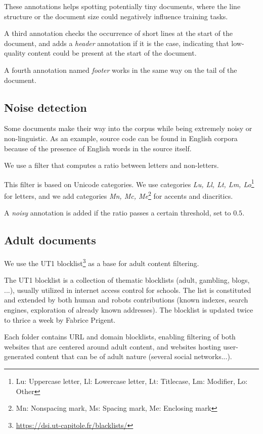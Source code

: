 These annotations helps spotting potentially tiny documents, where the line structure or the document size could negatively influence training tasks.

A third annotation checks the occurrence of short lines at the start of the document, and adds a \emph{header} annotation if it is the case, indicating that low-quality content could be present at the start of the document.

A fourth annotation named \emph{footer} works in the same way on the tail of the document.

\subsection{Noise detection}

Some documents make their way into the corpus while being extremely noisy or non-linguistic. As an example, source code can be found in English corpora because of the presence of English words in the source itself.

We use a filter that computes a ratio between letters and non-letters.

This filter is based on Unicode categories. We use categories \emph{Lu, Ll, Lt, Lm, Lo}\footnote{Lu: Uppercase letter, Ll: Lowercase letter, Lt: Titlecase, Lm: Modifier, Lo: Other} for letters, and we add categories \emph{Mn, Mc, Me}\footnote{Mn: Nonspacing mark, Ms: Spacing mark, Me: Enclosing mark} for accents and diacritics.

A \emph{noisy} annotation is added if the ratio passes a certain threshold, set to $0.5$.


\subsection{Adult documents}

We use the UT1 blocklist\footnote{\url{https://dsi.ut-capitole.fr/blacklists/}} as a base for adult content filtering.

The UT1 blocklist is a collection of thematic blocklists (adult, gambling, blogs, ...), usually utilized in internet access control for schools. The list is constituted and extended by both human and robots contributions (known indexes, search engines, exploration of already known addresses). The blocklist is updated twice to thrice a week by Fabrice Prigent.

Each folder contains URL and domain blocklists, enabling filtering of both websites that are centered around adult content, and websites hosting user-generated content that can be of adult nature (several social networks...).

